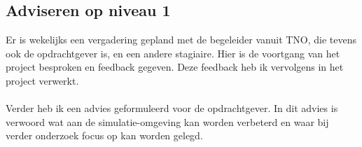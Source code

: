 \documentclass[12pt, letterpaper]{article}
\begin{document}
\begin{appendices}
\subsection{Adviseren op niveau 1}
Er is wekelijks een vergadering gepland met de begeleider vanuit TNO, die tevens ook de opdrachtgever is, en een andere stagiaire. Hier is de voortgang van het project besproken en feedback gegeven. Deze feedback heb ik vervolgens in het project verwerkt. 
\\ \\
Verder heb ik een advies geformuleerd voor de opdrachtgever. In dit advies is verwoord wat aan de simulatie-omgeving kan worden verbeterd en waar bij verder onderzoek focus op kan worden gelegd.


\end{appendices}
\end{document}
